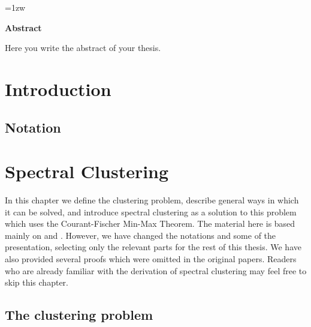 \thispagestyle{empty}
\vspace*{20pt plus 1fil}
\parindent=1zw
\noindent
\begin{center}
{\Large \bf Abstract}
\vspace{2cm}
\end{center}
Here you write the abstract of your thesis.

\par
\vspace{0pt plus 1fil}
\newpage

\tableofcontents
\listoffigures

\pagebreak \setcounter{page}{1}


\chapter{Introduction}


\section{Notation}

\chapter{Spectral Clustering}
In this chapter we define the clustering problem, describe general ways in which it can be solved, and introduce
spectral clustering as a solution to this problem which uses the Courant-Fischer Min-Max Theorem.
The material here is based mainly on \cite{ng} and \cite{tutorial}.
However, we have changed the notations and some of the presentation, selecting only the relevant parts for the rest of this thesis.
We have also provided several proofs which were omitted in the original papers.
Readers who are already familiar with the derivation of spectral clustering may feel free to skip this chapter. 

\section{The clustering problem}

